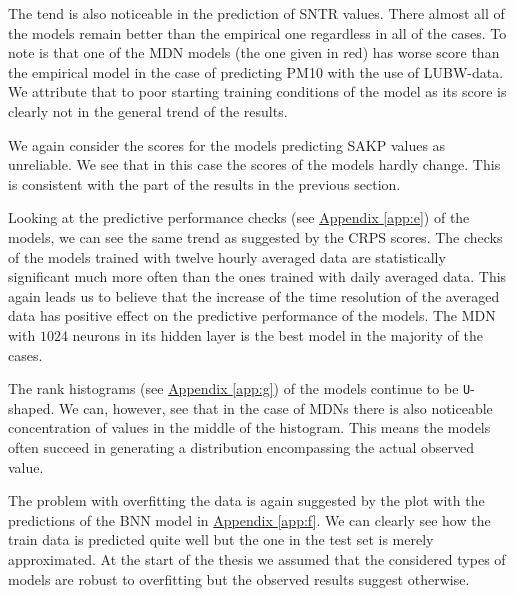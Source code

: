 \documentclass[12pt,a4paper,twoside]{scrartcl}
\numberwithin{equation}{section}
\newcommand{\refapp}[1]{\hyperref[#1]{Appendix \ref*{#1}}}
\begin{document}
The tend is also noticeable in the prediction of SNTR values. There almost all of the models remain better than the empirical one regardless in all of the cases. To note is that one of the MDN models (the one given in red) has worse score than the empirical model in the case of predicting PM10 with the use of LUBW-data. We attribute that to poor starting training conditions of the model as its score is clearly not in the general trend of the results.

We again consider the scores for the models predicting SAKP values as unreliable. We see that in this case the scores of the models hardly change. This is consistent with the part of the results in the previous section.

Looking at the predictive performance checks (see \refapp{app:e}) of the models, we can see the same trend as suggested by the CRPS scores. The checks of the models trained with twelve hourly averaged data are statistically significant much more often than the ones trained with daily averaged data. This again leads us to believe that the increase of the time resolution of the averaged data has positive effect on the predictive performance of the models. The MDN with \(1024\) neurons in its hidden layer is the best model in the majority of the cases.

The rank histograms (see \refapp{app:g}) of the models continue to be \texttt{U}-shaped. We can, however, see that in the case of MDNs there is also noticeable concentration of values in the middle of the histogram. This means the models often succeed in generating a distribution encompassing the actual observed value.

The problem with overfitting the data is again suggested by the plot with the predictions of the BNN model in \refapp{app:f}. We can clearly see how the train data is predicted quite well but the one in the test set is merely approximated. At the start of the thesis we assumed that the considered types of models are robust to overfitting but the observed results suggest otherwise.
\end{document}
